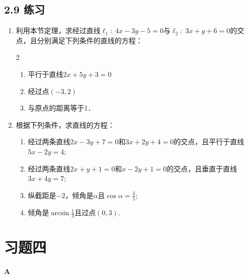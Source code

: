 \subsection*{2.9 练习}
\begin{enumerate}
\item 利用本节定理，求经过直线$\ell_1:\; 4x-3y-5=0$与$\ell_2:\; 3x+y+6=0$的交点，且分别满足下列条件的直线的方程：
\begin{multicols}{2}
 \begin{enumerate}[(1)]
\item 平行于直线$2x+5y+3=0$
\item 经过点$(-3,2)$
\item 与原点的距离等于1．
\end{enumerate}   
\end{multicols}


\item 根据下列条件，求直线的方程：
\begin{enumerate}[(1)]
    \item 经过两条直线$2x-3y+7=0$和$3x+2y+4=0$的交点，且平行于直线$5x-2y=4$;
    \item 经过两条直线$2x+y+1=0$和$x-2y+1=0$的交点，且垂直于直线$3x+4y=7$;
    \item 纵截距是$-2$，倾角是$\alpha$且$\cos\alpha=\frac{3}{5}$;
    \item 倾角是$\arcsin \frac{1}{3}$且过点$(0,3)$.
\end{enumerate}

\end{enumerate}

\section*{习题四}
\begin{center}
    \bfseries A
\end{center}

